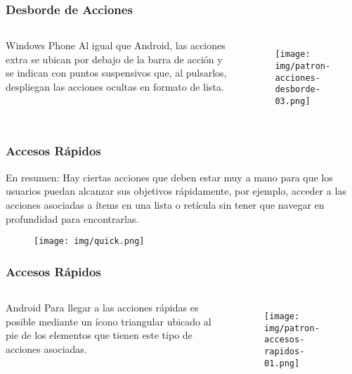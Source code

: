 \documentclass{beamer}
\begin{document}

\begin{frame}
\frametitle{Desborde de Acciones}

\begin{columns}[c] %

\begin{block}{Windows Phone}
\justify
Al igual que Android, las acciones extra se ubican por debajo de la barra de acción y se indican con puntos suspensivos que, al pulsarlos, despliegan las acciones ocultas en formato de lista.
\end{block}

\begin{figure}[H]
  \centering
  \texttt{[image: img/patron-acciones-desborde-03.png]}
\end{figure}
\end{columns}
\end{frame}


\begin{frame}
\frametitle{Accesos Rápidos}

\begin{block}{En resumen:}
\justify
Hay ciertas acciones que deben estar muy a mano para que los usuarios puedan alcanzar sus objetivos rápidamente, por ejemplo, acceder a las acciones asociadas a ítems en una lista o retícula sin tener que navegar en profundidad para encontrarlas.
\end{block}

\begin{figure}[H]
  \centering
  \texttt{[image: img/quick.png]}
\end{figure}
\end{frame}


\begin{frame}
\frametitle{Accesos Rápidos}

\begin{columns}[c] %

\begin{block}{Android}
\justify
Para llegar a las acciones rápidas es posible mediante un ícono triangular ubicado al pie de los elementos que tienen este tipo de acciones asociadas.
\end{block}

\begin{figure}[H]
  \centering
  \texttt{[image: img/patron-accesos-rapidos-01.png]}
\end{figure}
\end{columns}
\end{frame}
\end{document}
